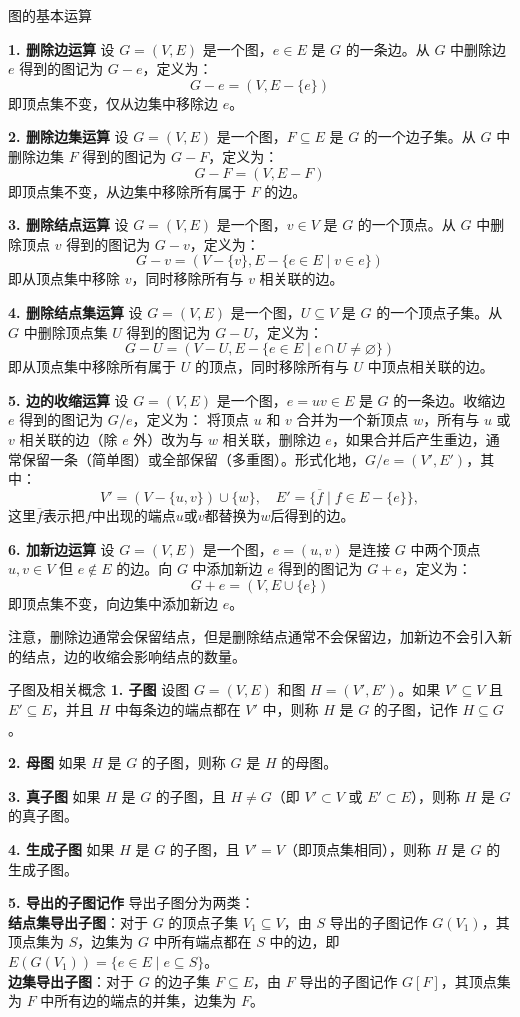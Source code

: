 \begin{definition}{图的基本运算}{}

\textbf{1. 删除边运算}
设 $G = (V, E)$ 是一个图，$e \in E$ 是 $G$ 的一条边。从 $G$ 中删除边 $e$ 得到的图记为 $G - e$，定义为：
\[
G - e = (V, E - \{e\})
\]
即顶点集不变，仅从边集中移除边 $e$。

\textbf{2. 删除边集运算}
设 $G = (V, E)$ 是一个图，$F \subseteq E$ 是 $G$ 的一个边子集。从 $G$ 中删除边集 $F$ 得到的图记为 $G - F$，定义为：
\[
G - F = (V, E- F)
\]
即顶点集不变，从边集中移除所有属于 $F$ 的边。

\textbf{3. 删除结点运算}
设 $G = (V, E)$ 是一个图，$v \in V$ 是 $G$ 的一个顶点。从 $G$ 中删除顶点 $v$ 得到的图记为 $G - v$，定义为：
\[
G - v = (V - \{v\}, E-\{e \in E \mid v \in e\})
\]
即从顶点集中移除 $v$，同时移除所有与 $v$ 相关联的边。

\textbf{4. 删除结点集运算}
设 $G = (V, E)$ 是一个图，$U \subseteq V$ 是 $G$ 的一个顶点子集。从 $G$ 中删除顶点集 $U$ 得到的图记为 $G - U$，定义为：
\[
G - U = (V - U, E - \{e \in E \mid e \cap U \neq \varnothing\})
\]
即从顶点集中移除所有属于 $U$ 的顶点，同时移除所有与 $U$ 中顶点相关联的边。

\textbf{5. 边的收缩运算}
设 $G = (V, E)$ 是一个图，$e = uv \in E$ 是 $G$ 的一条边。收缩边 $e$ 得到的图记为 $G/e$，定义为：
将顶点 $u$ 和 $v$ 合并为一个新顶点 $w$，所有与 $u$ 或 $v$ 相关联的边（除 $e$ 外）改为与 $w$ 相关联，删除边 $e$，如果合并后产生重边，通常保留一条（简单图）或全部保留（多重图）。形式化地，$G/e = (V', E')$，其中：
\[
V' = (V - \{u, v\}) \cup \{w\}, \quad
E' = \{\overline{f}\mid f\in E-\{e\}\},
\]
这里$\overline{f}$表示把$f$中出现的端点$u$或$v$都替换为$w$后得到的边。

\textbf{6. 加新边运算}
设 $G = (V, E)$ 是一个图，$e = (u,v)$ 是连接 $G$ 中两个顶点 $u, v \in V$ 但 $e \notin E$ 的边。向 $G$ 中添加新边 $e$ 得到的图记为 $G + e$，定义为：
\[
G + e = (V, E \cup \{e\})
\]
即顶点集不变，向边集中添加新边 $e$。
\end{definition}
注意，删除边通常会保留结点，但是删除结点通常不会保留边，加新边不会引入新的结点，边的收缩会影响结点的数量。
\begin{definition}{子图及相关概念}{}
\textbf{1. 子图}
设图 $G = (V, E)$ 和图 $H = (V', E')$。如果 $V' \subseteq V$ 且 $E' \subseteq E$，并且 $H$ 中每条边的端点都在 $V'$ 中，则称 $H$ 是 $G$ 的子图，记作 $H \subseteq G$。

\textbf{2. 母图}
如果 $H$ 是 $G$ 的子图，则称 $G$ 是 $H$ 的母图。

\textbf{3. 真子图}
如果 $H$ 是 $G$ 的子图，且 $H \neq G$（即 $V' \subset V$ 或 $E' \subset E$），则称 $H$ 是 $G$ 的真子图。

\textbf{4. 生成子图}
如果 $H$ 是 $G$ 的子图，且 $V' = V$（即顶点集相同），则称 $H$ 是 $G$ 的生成子图。

\textbf{5. 导出的子图记作}
导出子图分为两类：\\
\textbf{结点集导出子图}：对于 $G$ 的顶点子集 $V_1 \subseteq V$，由 $S$ 导出的子图记作 $G(V_1)$，其顶点集为 $S$，边集为 $G$ 中所有端点都在 $S$ 中的边，即 $E(G(V_1)) = \{ e \in E \mid e \subseteq S \}$。\\
\textbf{边集导出子图}：对于 $G$ 的边子集 $F \subseteq E$，由 $F$ 导出的子图记作 $G[F]$，其顶点集为 $F$ 中所有边的端点的并集，边集为 $F$。
\end{definition}
